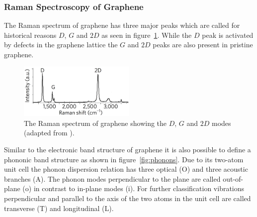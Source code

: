 \subsubsection{Raman Spectroscopy of Graphene}

The Raman spectrum of graphene has three major peaks which are called for historical reasons $D$, $G$ and $2D$ as seen in figure~\ref{fig:dispersion}. While the $D$ peak is activated by defects in the graphene lattice the $G$ and $2D$ peaks are also present in pristine graphene\cite{Ferrari2013}.

\begin{figure}[!h]
  \centering
  \includegraphics[width=0.5\textwidth]{./images/graphene-raman.png}
  \caption{The Raman spectrum of graphene showing the $D$, $G$ and $2D$ modes (adapted from \cite{Ferrari2013}).}
  \label{fig:dispersion}
\end{figure}

Similar to the electronic band structure of graphene it is also possible to define a phononic band structure as shown in figure~\ref{fig:phonons}. Due to its two-atom unit cell the phonon dispersion relation has three optical (O) and three acoustic branches (A). The phonon modes perpendicular to the plane are called out-of-plane (o) in contrast to in-plane modes (i). For further classification vibrations perpendicular and parallel to the axis of the two atoms in the unit cell are called transverse (T) and longitudinal (L).

